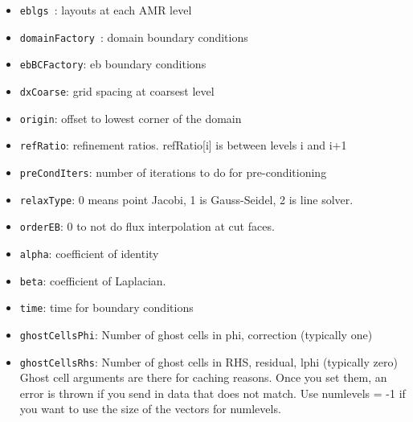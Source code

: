 \begin{itemize}
     \item {\tt eblgs }: layouts at each AMR level 
     \item {\tt domainFactory }: domain boundary conditions 
     \item {\tt ebBCFactory}:    eb boundary conditions 
     \item {\tt dxCoarse}:      grid spacing at coarsest level 
     \item {\tt origin}:        offset to lowest corner of the domain 
     \item {\tt refRatio}:     refinement ratios. refRatio[i] is between levels i and i+1 
     \item {\tt preCondIters}:  number of iterations to do for pre-conditioning 
     \item {\tt relaxType}:     0 means point Jacobi, 1 is Gauss-Seidel, 2 is line solver. 
     \item {\tt orderEB}:       0 to not do flux interpolation at cut faces. 
     \item {\tt alpha}:         coefficient of identity 
     \item {\tt beta}:          coefficient of Laplacian.
     \item {\tt time}:          time for boundary conditions 
     \item {\tt ghostCellsPhi}:  Number of ghost cells in phi, correction (typically one)
     \item {\tt ghostCellsRhs}:  Number of ghost cells in RHS, residual, lphi (typically zero)
     Ghost cell arguments are there for caching reasons.  Once you set them, an error is thrown if 
     you send in data that does not match.   Use numlevels = -1 if you want to use the
     size of the vectors for numlevels.
\end{itemize}

